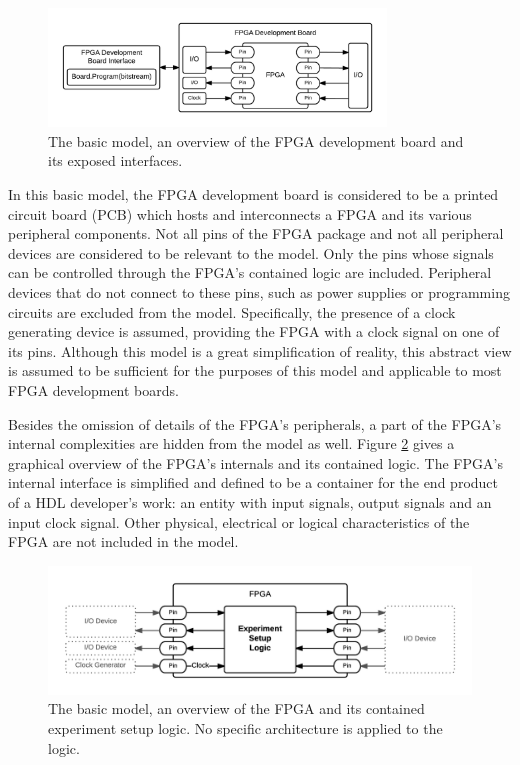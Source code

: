 \documentclass[openright]{template/uva-bachelor-thesis}
\begin{document}
\begin{figure}[h]
\centering
\includegraphics[width=0.8\textwidth]{img/overview-basic}
\caption{The basic model, an overview of the FPGA development board and its exposed interfaces.}
\label{fig:overview-basic}
\end{figure}

In this basic model, the FPGA development board is considered to be a printed circuit board (PCB) which hosts and interconnects a FPGA and its various peripheral components. Not all pins of the FPGA package and not all peripheral devices are considered to be relevant to the model. Only the pins whose signals can be controlled through the FPGA's contained logic are included. Peripheral devices that do not connect to these pins, such as power supplies or programming circuits are excluded from the model. Specifically, the presence of a clock generating device is assumed, providing the FPGA with a clock signal on one of its pins. Although this model is a great simplification of reality, this abstract view is assumed to be sufficient for the purposes of this model and applicable to most FPGA development boards. 

Besides the omission of details of the FPGA's peripherals, a part of the FPGA's internal complexities are hidden from the model as well. Figure \ref{fig:fpga-basic} gives a graphical overview of the FPGA's internals and its contained logic. The FPGA's internal interface is simplified and defined to be a container for the end product of a HDL developer's work: an entity with input signals, output signals and an input clock signal. Other physical, electrical or logical characteristics of the FPGA are not included in the model.

\begin{figure}[h]
\centering
\includegraphics[width=\textwidth]{img/fpga-basic}
\caption{The basic model, an overview of the FPGA and its contained experiment setup logic. No specific architecture is applied to the logic.}
\label{fig:fpga-basic}
\end{figure}
\end{document}
